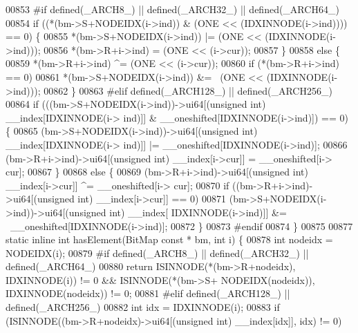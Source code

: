 \begin{DoxyCode}
00853 \textcolor{preprocessor}{#if defined(\_ARCH8\_) || defined(\_ARCH32\_) || defined(\_ARCH64\_)}
00854         \textcolor{keywordflow}{if} ((*(bm->S+NODEIDX(i->ind)) & (ONE << (IDXINNODE(i->ind)))) == 0) \{
00855                 *(bm->S+NODEIDX(i->ind)) |= (ONE << (IDXINNODE(i->ind)));
00856                 *(bm->R+i->ind) = (ONE << (i->cur));
00857         \}
00858         \textcolor{keywordflow}{else} \{
00859                 *(bm->R+i->ind) ^= (ONE << (i->cur));
00860                 \textcolor{keywordflow}{if} (*(bm->R+i->ind) == 0)
00861                         *(bm->S+NODEIDX(i->ind)) &= ~(ONE << (IDXINNODE(i->ind)));
00862         \}
00863 \textcolor{preprocessor}{#elif defined(\_ARCH128\_) || defined(\_ARCH256\_)}
00864         \textcolor{keywordflow}{if} (((bm->S+NODEIDX(i->ind))->ui64[(\textcolor{keywordtype}{unsigned} \textcolor{keywordtype}{int}) \_\_index[IDXINNODE(i->
      ind)]] & \_\_oneshifted[IDXINNODE(i->ind)]) == 0) \{
00865                 (bm->S+NODEIDX(i->ind))->ui64[(\textcolor{keywordtype}{unsigned} \textcolor{keywordtype}{int}) \_\_index[IDXINNODE(i->
      ind)]] |= \_\_oneshifted[IDXINNODE(i->ind)];
00866                 (bm->R+i->ind)->ui64[(\textcolor{keywordtype}{unsigned} \textcolor{keywordtype}{int}) \_\_index[i->cur]] = \_\_oneshifted[i->
      cur];
00867         \}
00868         \textcolor{keywordflow}{else} \{
00869                 (bm->R+i->ind)->ui64[(\textcolor{keywordtype}{unsigned} \textcolor{keywordtype}{int}) \_\_index[i->cur]] ^= \_\_oneshifted[i->
      cur];
00870                 \textcolor{keywordflow}{if} ((bm->R+i->ind)->ui64[(\textcolor{keywordtype}{unsigned} int) \_\_index[i->cur]] == 0)
00871                         (bm->S+NODEIDX(i->ind))->ui64[(\textcolor{keywordtype}{unsigned} \textcolor{keywordtype}{int}) \_\_index[
      IDXINNODE(i->ind)]] &= ~\_\_oneshifted[IDXINNODE(i->ind)];
00872         \}
00873 \textcolor{preprocessor}{#endif}
00874 \}
00875 
00877 \textcolor{keyword}{static} \textcolor{keyword}{inline} \textcolor{keywordtype}{int} hasElement(BitMap \textcolor{keyword}{const} * bm, \textcolor{keywordtype}{int} i) \{
00878         \textcolor{keywordtype}{int} nodeidx = NODEIDX(i);
00879 \textcolor{preprocessor}{#if defined(\_ARCH8\_) || defined(\_ARCH32\_) || defined(\_ARCH64\_)}
00880         \textcolor{keywordflow}{return} ISINNODE(*(bm->R+nodeidx), IDXINNODE(i)) != 0 && ISINNODE(*(bm->S+
      NODEIDX(nodeidx)), IDXINNODE(nodeidx)) != 0;
00881 \textcolor{preprocessor}{#elif defined(\_ARCH128\_) || defined(\_ARCH256\_)}
00882         \textcolor{keywordtype}{int} idx = IDXINNODE(i);
00883         \textcolor{keywordflow}{if} (ISINNODE((bm->R+nodeidx)->ui64[(\textcolor{keywordtype}{unsigned} \textcolor{keywordtype}{int}) \_\_index[idx]], idx) != 0)

\end{DoxyCode}
